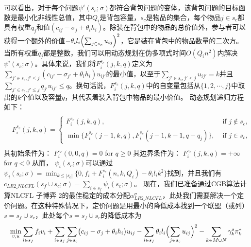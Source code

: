 \documentclass[UTF8]{article}
\begin{document}
\begin{定义}
\begin{eqnarray}
\begin{aligned}
\begin{split}
      \end{split}
      \end{aligned}
      \end{eqnarray}
      可以看出，对于每个问题$\psi^i(s_c;\sigma)$都符合背包问题的变体，该背包问题的目标函数是最小化非线性总值，其中$Q_i$是背包容量，$s_c$是物品的集合，每个物品$j\in s_c$都具有权重$q_j$和值$(c_{ij}-\sigma_j+\theta_ih_i)$。除装在背包中的物品的总价值外，参与者可以获得一个额外的价值$-\theta_il_i \Bigl( \sum_{j \in s_c}u_{ij}\Bigr)^2$，它是装在背包中的物品数量的二次方。当所有权重$q_j$都是整数，我们可以用动态规划在伪多项式时间$O(Q_in^2)$内解决$\psi^i(s_c;\sigma)$。具体来说，我们将$F^{s_c}_i(j,k,q)$定义为$\sum_{j'\in s_c,j'\leq j}(c_{ij'}-\sigma_{j'}+\theta_ih_i)u_{ij'}$的最小值，以至于$\sum_{j'\in s_c,j'\leq j}u_{ij'}=k$并且$\sum_{j'\in s_c,j'\leq j}q_{j'}u_{ij'}\leq q$。换句话说，$F^{s_c}_i(j,k,q)$中的自变量包括从$\{1,2,\cdots,j\}$中取出的$k$个值以及容量$q$，其代表着装入背包中物品的最小价值。
      动态规划递归方程如下：
      \begin{eqnarray*}
      \begin{aligned}
      \begin{split}
      F^{s_c}_i(j,k,q)=\left\{
      \begin{array}{ll}
      F^{s_c}_i(j,k,q), & \mbox{ if } j\not\in s_c,
      \\[3mm]
      \min\big\{F^{s_c}_i(j-1,k,q),F^{s_c}_i(j-1,k-1,q-q_j) \big\}, & \mbox{ if } j\in s_c,
      \end{array}\right.
      \end{split}
      \end{aligned}
      \end{eqnarray*}
      其初始条件为：
      $F^{s_c}_i(0,0,q)=0$ for  $q\geq 0$
      其边界条件为：
      $F^{s_c}_i(j,k,q)=+\infty$ for $q<0$
      从而，
      $\psi_i(s_c;\sigma)$可以通过$\psi_i(s_c;\sigma) = \min_{k\leq |s_c|}\bigl\{ 0, f_i+F^{s_c}_i(n,k,Q_i)-\theta_i l_i k^2\bigr\}$找到，并且我们有$c_{LR2\_NLCFL}(s_f \cup s_c;\sigma) = \sum_{i \in s_f} \psi_i(s_c;\sigma)$。
      现在，我们已准备通过CGB算法计算NLCFL 子博弈 2的最佳稳定的成本分配$\alpha_{LR2\_NLCFL}^{\sigma}$，此处我们需要解决一个定价问题。在这种特殊情况下，定价问题是用最小的降低成本找到一个联盟（或列）$s=s_f \cup s_c$，此处每个$s = s_f \cup s_c$的降低成本为
      \begin{eqnarray}\label{eqn:pricing1nlcfl}
      \begin{aligned}
      \begin{split}
      \min_{v,u}  \sum_{i \in s_f} f_i v_i + \sum_{i \in s_f}\sum_{j \in s_c} &\big(c_{ij} - \sigma_j + \theta_ih_i\big)u_{ij} - \sum_{i \in s_f} \theta_il_i \Bigl( \sum_{j \in s_c}u_{ij}\Bigr)^2 - \sum_{k \in M \cup N} \gamma^s_k \pi_k^*\\

\end{split}
\end{aligned}
\end{eqnarray}
\end{定义}
\end{document}
